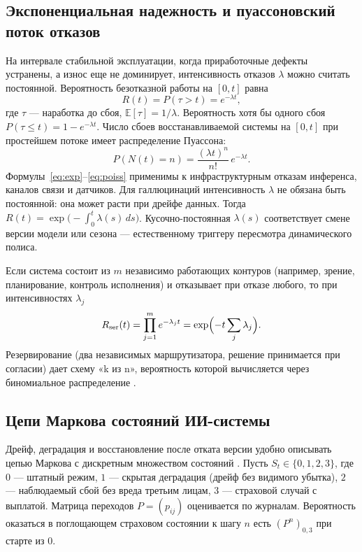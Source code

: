 \documentclass[a4paper,14pt]{extarticle}
\begin{document}
\subsection{Экспоненциальная надежность и пуассоновский поток отказов}

На интервале стабильной эксплуатации, когда приработочные дефекты устранены, а износ еще не доминирует, интенсивность отказов $\lambda$ можно считать постоянной. Вероятность безотказной работы на $[0,t]$ равна
\begin{equation}
R(t)=P(\tau>t)=e^{-\lambda t},
\label{eq:exp}
\end{equation}
где $\tau$ --- наработка до сбоя, $\mathbb{E}[\tau]=1/\lambda$. Вероятность хотя бы одного сбоя $P(\tau\le t)=1-e^{-\lambda t}$. Число сбоев восстанавливаемой системы на $[0,t]$ при простейшем потоке имеет распределение Пуассона:
\begin{equation}
P(N(t)=n)=\frac{(\lambda t)^n}{n!}\,e^{-\lambda t}.
\label{eq:poiss}
\end{equation}
Формулы~\eqref{eq:exp}--\eqref{eq:poiss} применимы к инфраструктурным отказам инференса, каналов связи и датчиков. Для галлюцинаций интенсивность $\lambda$ не обязана быть постоянной: она может расти при дрейфе данных. Тогда $R(t)=\exp\bigl(-\int_0^t \lambda(s)\,ds\bigr)$. Кусочно-постоянная $\lambda(s)$ соответствует смене версии модели или сезона --- естественному триггеру пересмотра динамического полиса.

Если система состоит из $m$ независимо работающих контуров (например, зрение, планирование, контроль исполнения) и отказывает при отказе любого, то при интенсивностях $\lambda_j$
\[
R_{\mathrm{ser}}(t)=\prod_{j=1}^{m} e^{-\lambda_j t}=\exp\Bigl(-t\sum_j\lambda_j\Bigr).
\]
Резервирование (два независимых маршрутизатора, решение принимается при согласии) дает схему «k из n», вероятность которой вычисляется через биномиальное распределение \cite{shvedov}.

\subsection{Цепи Маркова состояний ИИ-системы}

Дрейф, деградация и восстановление после отката версии удобно описывать цепью Маркова с дискретным множеством состояний \cite{shvedov}. Пусть $S_t\in\{0,1,2,3\}$, где $0$ --- штатный режим, $1$ --- скрытая деградация (дрейф без видимого убытка), $2$ --- наблюдаемый сбой без вреда третьим лицам, $3$ --- страховой случай с выплатой. Матрица переходов $P=(p_{ij})$ оценивается по журналам. Вероятность оказаться в поглощающем страховом состоянии к шагу $n$ есть $(P^n)_{0,3}$ при старте из $0$.
\end{document}
